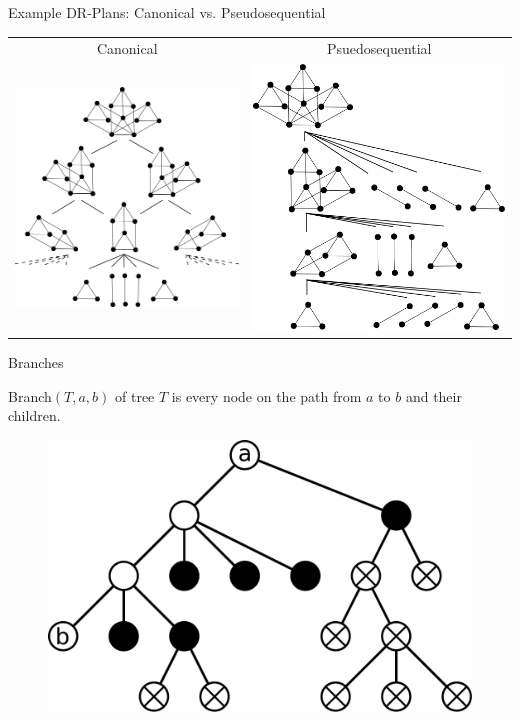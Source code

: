 \documentclass{mySlides}
\newcommand{\n}{\vspace{1em}}
\newcommand{\rvmps}{rvmps}
\begin{document}
\begin{frame}{Example DR-Plans: Canonical vs. Pseudosequential}
    \begin{tabular}{c | c}
        Canonical & Psuedosequential \\
        \includegraphics[width=.475\linewidth]{../../img/svg/3xc2c3_candrp_full} & \includegraphics[width=.475\linewidth]{../../img/svg/3xc2c3_seqdrp_full}
    \end{tabular}
\end{frame}

\begin{frame}{Branches}
    \begin{definition}[Branch]
        Branch$(T,a,b)$ of tree $T$ is every node on the path from $a$ to $b$ and their children.
    \end{definition}




    \begin{figure}\centering
        \includegraphics[width=.475\linewidth]{../../img/svg/branch_illustration}
    \end{figure}
\end{frame}
\end{document}
